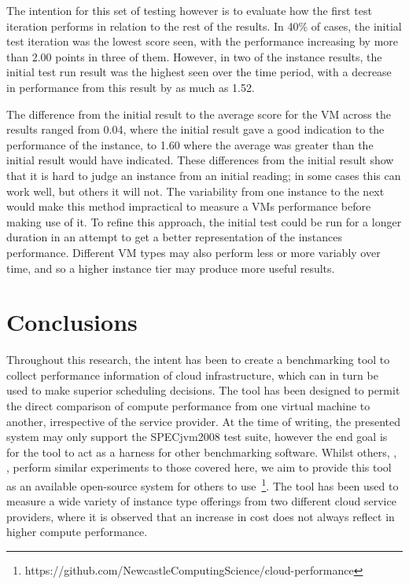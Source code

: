 \documentclass{entcs} \usepackage{entcsmacro}
\begin{document}
The intention for this set of testing however is to evaluate how the first test iteration performs in relation to the rest of the results. In 40\% of cases, the initial test iteration was the lowest score seen, with the performance increasing by more than 2.00 points in three of them. However, in two of the instance results, the initial test run result was the highest seen over the time period, with a decrease in performance from this result by as much as 1.52.

The difference from the initial result to the average score for the VM across the results ranged from 0.04, where the initial result gave a good indication to the performance of the instance, to 1.60 where the average was greater than the initial result would have indicated. These differences from the initial result show that it is hard to judge an instance from an initial reading; in some cases this can work well, but others it will not. The variability from one instance to the next would make this method impractical to measure a VMs performance before making use of it. To refine this approach, the initial test could be run for a longer duration in an attempt to get a better representation of the instances performance. Different VM types may also perform less or more variably over time, and so a higher instance tier may produce more useful results.


\section{Conclusions}

Throughout this research, the intent has been to create a benchmarking tool to collect performance information of cloud infrastructure, which can in turn be used to make superior scheduling decisions. The tool has been designed to permit the direct comparison of compute performance from one virtual machine to another, irrespective of the service provider. At the time of writing, the presented system may only support the SPECjvm2008 test suite, however the end goal is for the tool to act as a harness for other benchmarking software. Whilst others, \cite{li2010cloudcmp}, \cite{chhetri2013smart}, perform similar experiments to those covered here, we aim to provide this tool as an available open-source system for others to use~\footnote{https://github.com/NewcastleComputingScience/cloud-performance}. The tool has been used to measure a wide variety of instance type offerings from two different cloud service providers, where it is observed that an increase in cost does not always reflect in higher compute performance.
\end{document}
